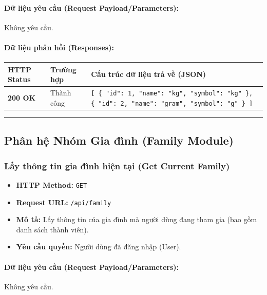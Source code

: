 \documentclass[12pt,a4paper]{article}
\begin{document}
\paragraph{Dữ liệu yêu cầu (Request Payload/Parameters):}
Không yêu cầu.\\

\paragraph{Dữ liệu phản hồi (Responses):}
\begin{longtable}{|>{\raggedright\arraybackslash}p{2.8cm}|>{\raggedright\arraybackslash}p{3.2cm}|>{\raggedright\arraybackslash}p{8.0cm}|}
\hline
\textbf{HTTP Status} & \textbf{Trường hợp} & \textbf{Cấu trúc dữ liệu trả về (JSON)} \\ \hline
\endhead
\textbf{200 OK} & Thành công & \texttt{[ \{ "id": 1, "name": "kg", "symbol": "kg" \}, \{ "id": 2, "name": "gram", "symbol": "g" \} ]} \\ \hline
\end{longtable}

\vskip 0.4cm
\noindent\rule{\textwidth}{0.3pt}
\vskip 0.4cm

\subsection{Phân hệ Nhóm Gia đình (Family Module)}

\subsubsection{Lấy thông tin gia đình hiện tại (Get Current Family)}
\begin{itemize}[leftmargin=*]
    \item \textbf{HTTP Method:} \texttt{GET}
    \item \textbf{Request URL:} \texttt{/api/family}
    \item \textbf{Mô tả:} Lấy thông tin của gia đình mà người dùng đang tham gia (bao gồm danh sách thành viên).
    \item \textbf{Yêu cầu quyền:} Người dùng đã đăng nhập (User).
\end{itemize}

\paragraph{Dữ liệu yêu cầu (Request Payload/Parameters):}
Không yêu cầu.\\
\end{document}
